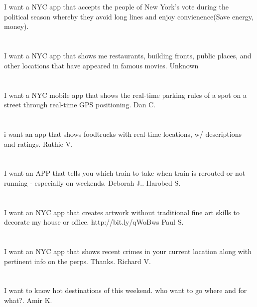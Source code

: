 \section{} I want a NYC app that accepts the people of New York's vote during the political season whereby they avoid long lines and enjoy convienence(Save energy,  money). 
\section{}I want a NYC app that shows me restaurants,  building fronts,  public places,  and other locations that have appeared in famous movies. Unknown
\section{}I want a NYC mobile app that shows the real-time parking rules of a spot on a street through real-time GPS positioning. Dan C.
\section{}i want an app that shows foodtrucks with real-time locations,  w/ descriptions and ratings. Ruthie V.
\section{}I want an APP that tells you which train to take when train is rerouted or not running - especially on weekends. Deborah J.. Harobed S.
\section{}I want an NYC app that creates artwork without traditional fine art skills to decorate my house or office. http://bit.ly/qWoBws  Paul S.
\section{}I want an NYC app that shows recent crimes in your current location along with pertinent info on the perps. Thanks.  Richard V.
\section{}I want to know hot destinations of this weekend. who want to go where and for what?. Amir K.
